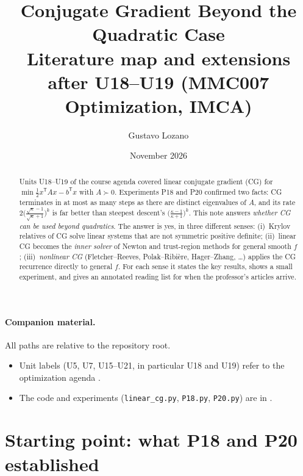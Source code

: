 \documentclass[11pt,a4paper]{article}
\title{Conjugate Gradient Beyond the Quadratic Case\\[0.3em]
\large Literature map and extensions after U18--U19 (MMC007 Optimization, IMCA)}
\author{Gustavo Lozano}
\date{November 2026}
\theoremstyle{remark}
\newcommand{\T}{^{\mathsf T}}
\begin{document}
\maketitle

\paragraph{Companion material.} All paths are relative to the repository root.
\begin{itemize}[leftmargin=1.5em,itemsep=2pt]
\item Unit labels (U5, U7, U15--U21, in particular U18 and U19) refer to the optimization agenda
.
\item The code and experiments (\texttt{linear\_cg.py}, \texttt{P18.py}, \texttt{P20.py}) are in
.
\end{itemize}


\begin{abstract}
Units U18--U19 of the course agenda covered linear conjugate gradient (CG) for $\min \tfrac12 x\T Ax - b\T x$ with $A\succ 0$. Experiments P18 and P20 confirmed two facts: CG terminates in at most as many steps as there are distinct eigenvalues of $A$, and its rate $2\bigl(\tfrac{\sqrt\kappa-1}{\sqrt\kappa+1}\bigr)^k$ is far better than steepest descent's $\bigl(\tfrac{\kappa-1}{\kappa+1}\bigr)^k$. This note answers \emph{whether CG can be used beyond quadratics}. The answer is yes, in three different senses: (i)~Krylov relatives of CG solve linear systems that are not symmetric positive definite; (ii)~linear CG becomes the \emph{inner solver} of Newton and trust-region methods for general smooth $f$; (iii)~\emph{nonlinear CG} (Fletcher--Reeves, Polak--Ribi\`ere, Hager--Zhang, \dots) applies the CG recurrence directly to general $f$. For each sense it states the key results, shows a small experiment, and gives an annotated reading list for when the professor's articles arrive.
\end{abstract}

\tableofcontents



\section{Starting point: what P18 and P20 established}
\end{document}
